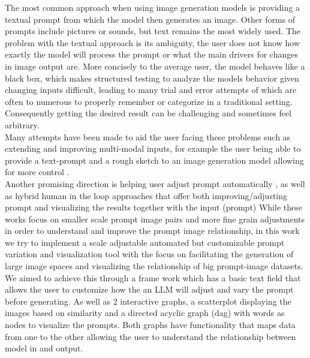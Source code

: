 \documentclass[
  a4paper,  %
  twoside,  %
  bibliography=totoc,
  headsepline,
  cleardoublepage=empty,
  parskip=half,
  draft=false
]{scrbook}
\begin{document}
The most common approach when using image generation models is providing a textual prompt from which the model then generates an image. Other forms of prompts include pictures or sounds, but text remains the most widely used. The problem with the textual  approach is its ambiguity, the user does not know how exactly the model will process the prompt or what the main drivers for changes in image output are. More concisely to the average user, the model behaves like a black box, which makes structured testing to analyze the models behavior given changing inputs difficult, leading to many trial and error attempts of which are often to numerous to properly remember or categorize in a traditional setting. Consequently getting the desired result can be challenging and sometimes feel arbitrary.\\
Many attempts have been made to aid the user facing these problems such as extending and improving multi-modal inputs, for example the user being able to provide a text-prompt and a rough sketch to an image generation model allowing for more control  \cite{lin2025sketchflexfacilitatingspatialsemanticcoherence}. \\Another promising direction is helping user adjust prompt automatically \cite{10.1145/3729176.3729203,You2024Aesthetic},
as well as hybrid human in the loop approaches that offer both improving/adjusting prompt and visualizing the results together with the input (prompt) \cite{PromptMagician,mishra2025promptaidpromptexplorationperturbation,brade2023promptifytexttoimagegenerationinteractive,guo2024prompthisvisualizingprocessinfluence,promptCharm}
While these works focus on smaller scale prompt image pairs and more fine grain adjustments in order to understand and improve the prompt image relationship, in this work we try to implement a scale adjustable automated but customizable prompt variation and visualization tool with the focus on  facilitating the generation of large image spaces and visualizing the relationship of big prompt-image datasets.\\
We aimed to achieve this through a frame work which has a basic text field that allows the user to customize how the an LLM will adjust and vary the prompt before generating. As well as 2 interactive graphs, a scatterplot displaying the images based on similarity and a directed acyclic graph (dag) with words as nodes to visualize the prompts. Both graphs have functionality that maps data from one to the other allowing the user to understand the relationship between model in and output.
\end{document}
